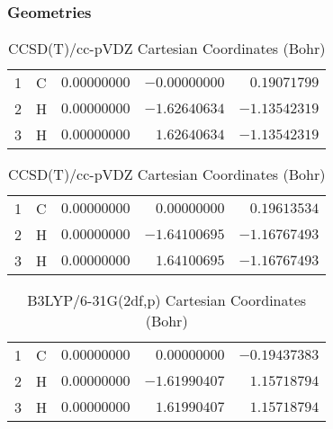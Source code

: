 \documentclass[10pt,oneside]{article}
\begin{document}
\clearpage

\subsection{}

\begin{table}[h!]
\subsubsection*{Geometries}
\begin{multicols}{2}
\centering
\caption{CCSD(T)/cc-pVTZ Cartesian Coordinates (Bohr)}
\begin{tabular}{llrrr}
\toprule
1  & C  & $ 0.00000000$ & $-0.00000000$ & $ 0.19071799$ \\
2  & H  & $ 0.00000000$ & $-1.62640634$ & $-1.13542319$ \\
3  & H  & $ 0.00000000$ & $ 1.62640634$ & $-1.13542319$ \\
\bottomrule
\end{tabular}
\caption{CCSD(T)/cc-pVDZ Cartesian Coordinates (Bohr)}
\begin{tabular}{llrrr}
\toprule
1  & C  & $ 0.00000000$ & $ 0.00000000$ & $ 0.19613534$ \\
2  & H  & $ 0.00000000$ & $-1.64100695$ & $-1.16767493$ \\
3  & H  & $ 0.00000000$ & $ 1.64100695$ & $-1.16767493$ \\
\bottomrule
\end{tabular}
\end{multicols}
\end{table}

\begin{table}[h]
\centering
\caption{B3LYP/6-31G(2df,p) Cartesian Coordinates (Bohr)}
\begin{tabular}{llrrr}
\toprule
1  & C  & $ 0.00000000$ & $ 0.00000000$ & $-0.19437383$ \\
2  & H  & $ 0.00000000$ & $-1.61990407$ & $ 1.15718794$ \\
3  & H  & $ 0.00000000$ & $ 1.61990407$ & $ 1.15718794$ \\
\bottomrule
\end{tabular}
\end{table}
\end{document}
